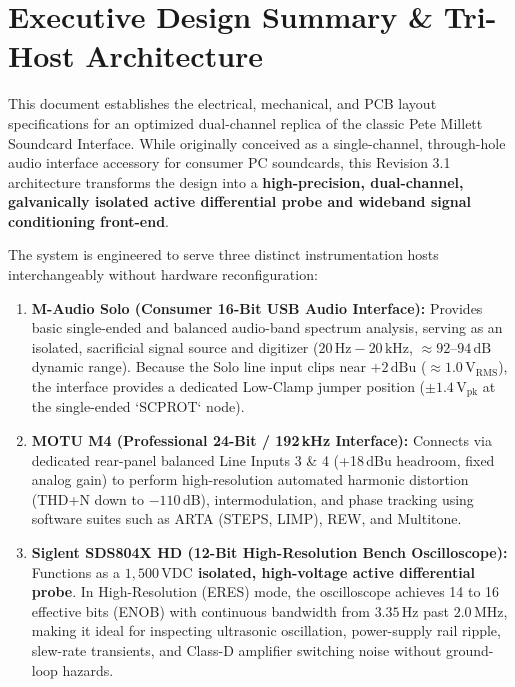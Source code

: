 \documentclass[11pt, letterpaper]{article}
\begin{document}
\section{Executive Design Summary \& Tri-Host Architecture}

This document establishes the electrical, mechanical, and PCB layout specifications for an optimized dual-channel replica of the classic Pete Millett Soundcard Interface. While originally conceived as a single-channel, through-hole audio interface accessory for consumer PC soundcards, this Revision 3.1 architecture transforms the design into a \textbf{high-precision, dual-channel, galvanically isolated active differential probe and wideband signal conditioning front-end}.

The system is engineered to serve three distinct instrumentation hosts interchangeably without hardware reconfiguration:
\begin{enumerate}[label=\textbf{\arabic*.}]
    \item \textbf{M-Audio Solo (Consumer 16-Bit USB Audio Interface):} Provides basic single-ended and balanced audio-band spectrum analysis, serving as an isolated, sacrificial signal source and digitizer ($20\,\text{Hz} - 20\,\text{kHz}$, $\approx 92\text{--}94\,\text{dB}$ dynamic range). Because the Solo line input clips near $+2\,\text{dBu}$ ($\approx 1.0\,\text{V}_{\text{RMS}}$), the interface provides a dedicated Low-Clamp jumper position ($\pm 1.4\,\text{V}_{\text{pk}}$ at the single-ended `SCPROT` node).
    \item \textbf{MOTU M4 (Professional 24-Bit / 192\,kHz Interface):} Connects via dedicated rear-panel balanced Line Inputs 3 \& 4 (+18\,dBu headroom, fixed analog gain) to perform high-resolution automated harmonic distortion (THD+N down to $-110$\,dB), intermodulation, and phase tracking using software suites such as ARTA (STEPS, LIMP), REW, and Multitone.
    \item \textbf{Siglent SDS804X HD (12-Bit High-Resolution Bench Oscilloscope):} Functions as a \textbf{$1,500\,\text{VDC}$ isolated, high-voltage active differential probe}. In High-Resolution (ERES) mode, the oscilloscope achieves 14 to 16 effective bits (ENOB) with continuous bandwidth from $3.35\,\text{Hz}$ past $2.0\,\text{MHz}$, making it ideal for inspecting ultrasonic oscillation, power-supply rail ripple, slew-rate transients, and Class-D amplifier switching noise without ground-loop hazards.
\end{enumerate}
\end{document}
